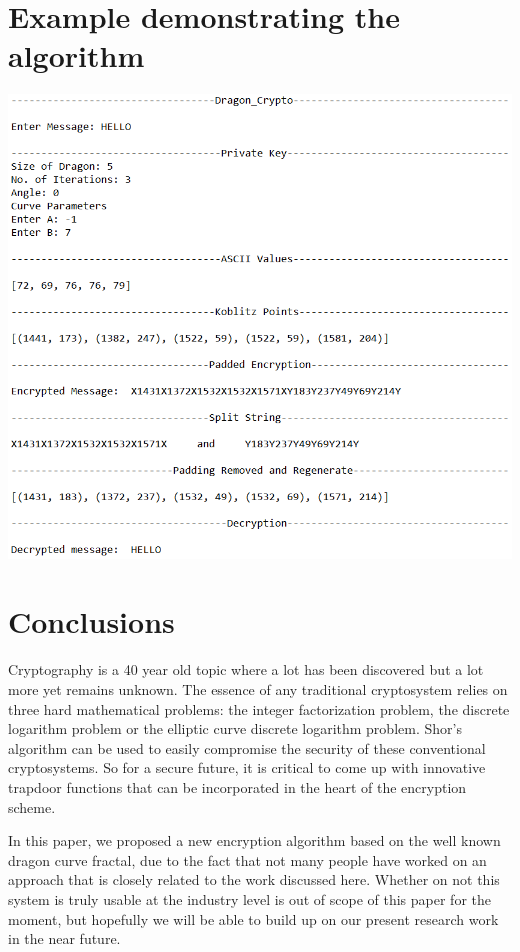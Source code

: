 \documentclass[a4paper,12pt]{article}
\begin{document}
\section{Example demonstrating the algorithm}
\begin{center}
    \includegraphics[scale=0.77]{images/output.png}
\end{center}

\section{Conclusions}
\begin{flushleft}
    Cryptography is a 40 year old topic where a lot has been discovered but a lot more yet remains unknown. The essence of any traditional cryptosystem relies on three hard mathematical problems: the integer factorization problem, the discrete logarithm problem or the elliptic curve discrete logarithm problem. Shor's algorithm can be used to easily compromise the security of these conventional cryptosystems. So for a secure future, it is critical to come up with innovative trapdoor functions that can be incorporated in the heart of the encryption scheme.
\end{flushleft}

\begin{flushleft}
   In this paper, we proposed a new encryption algorithm based on the well known dragon curve fractal, due to the fact that not many people have worked on an approach that is closely related to the work discussed here. Whether on not this system is truly usable at the industry level is out of scope of this paper for the moment, but hopefully we will be able to build up on our present research work in the near future. 
\end{flushleft}
\end{document}
